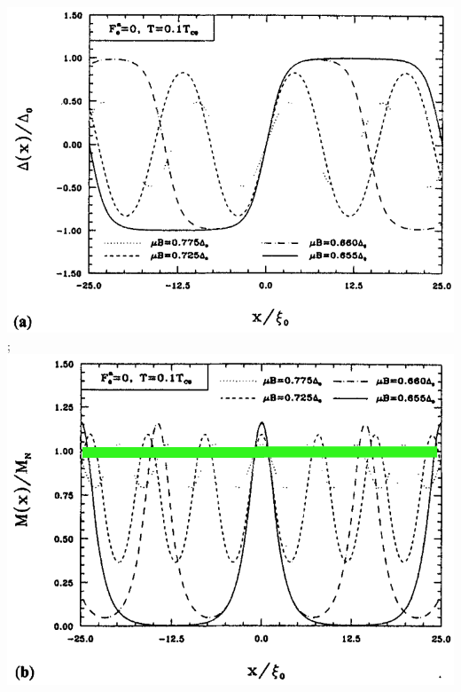 \documentclass[amssymb,amsmath]{beamer}
\begin{document}
\begin{frame}
\begin{columns}
\begin{column}{0.6\textwidth}
{            {\includegraphics[scale=0.13]{./figures/Rainer_DW.png}};}\includegraphics[scale=0.13]{./figures/Rainer_M.png} \\
     \\
\end{column}
\end{columns}
\end{frame}
\end{document}
